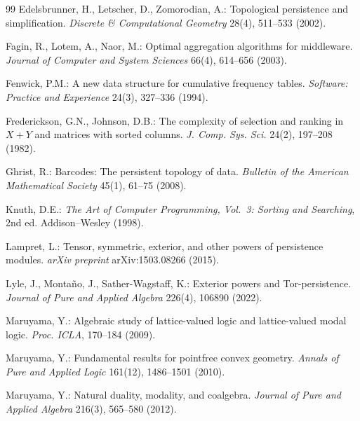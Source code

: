 \documentclass[runningheads]{llncs}
\begin{document}
\begin{thebibliography}{99}
Edelsbrunner, H., Letscher, D., Zomorodian, A.:
\newblock Topological persistence and simplification.
\newblock \emph{Discrete \& Computational Geometry} 28(4), 511--533 (2002).

Fagin, R., Lotem, A., Naor, M.:
\newblock Optimal aggregation algorithms for middleware.
\newblock \emph{Journal of Computer and System Sciences} 66(4), 614--656 (2003).

Fenwick, P.M.:
\newblock A new data structure for cumulative frequency tables.
\newblock \emph{Software: Practice and Experience} 24(3), 327--336 (1994).

Frederickson, G.N., Johnson, D.B.:
\newblock The complexity of selection and ranking in $X{+}Y$ and matrices with sorted columns.
\newblock \emph{J. Comp. Sys. Sci.} 24(2), 197--208 (1982).

Ghrist, R.:
\newblock Barcodes: The persistent topology of data.
\newblock \emph{Bulletin of the American Mathematical Society} 45(1), 61--75 (2008).


Knuth, D.E.:
\newblock \emph{The Art of Computer Programming, Vol.~3: Sorting and Searching}, 2nd ed.
\newblock Addison--Wesley (1998).

Lampret, L.:
\newblock Tensor, symmetric, exterior, and other powers of persistence modules.
\newblock \emph{arXiv preprint} arXiv:1503.08266 (2015).

Lyle, J., Montaño, J., Sather-Wagstaff, K.:
\newblock Exterior powers and Tor-persistence.
\newblock \emph{Journal of Pure and Applied Algebra} 226(4), 106890 (2022).


Maruyama, Y.:
\newblock Algebraic study of lattice-valued logic and lattice-valued modal logic.
\newblock \emph{Proc. ICLA}, 170--184 (2009).

Maruyama, Y.:
\newblock Fundamental results for pointfree convex geometry.
\newblock \emph{Annals of Pure and Applied Logic} 161(12), 1486--1501 (2010).

Maruyama, Y.:
\newblock Natural duality, modality, and coalgebra.
\newblock \emph{Journal of Pure and Applied Algebra} 216(3), 565--580 (2012).


\end{thebibliography}
\end{document}
